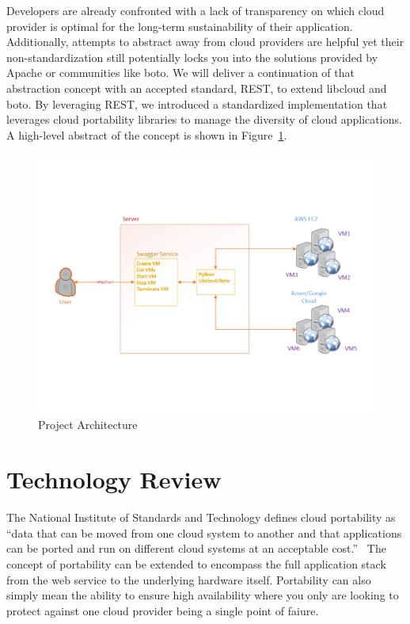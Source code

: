 Developers are already confronted with a lack of transparency on which cloud
provider is optimal for the long-term sustainability of their application.
Additionally, attempts to abstract away from cloud providers are helpful yet
their non-standardization still potentially locks you into the solutions
provided by Apache or communities like boto. We will deliver a continuation of
that abstraction concept with an accepted standard, REST, to extend libcloud and
boto. By leveraging REST, we introduced a standardized implementation
that leverages cloud portability libraries to manage the diversity of cloud
applications. A high-level abstract of the concept is shown in
Figure~\ref{F:arch}.

\begin{figure}[!ht]
  \centering
  \includegraphics[width=\columnwidth]{images/proj-arch.pdf}
  \caption{Project Architecture}\label{F:arch}
\end{figure}

\section{Technology Review}

The National Institute of Standards and Technology defines cloud  portability as
``data that can be moved from one cloud system to another and that  applications
can be ported and run on different  cloud systems at an  acceptable
cost.''~\cite{hid-sp18-518-NIST-291} The concept of portability can be extended
to encompass the full application stack from the web service to the underlying
hardware itself. Portability can also simply mean the ability to ensure high
availability where you only are looking to protect against one cloud provider
being a single point of faiure.

